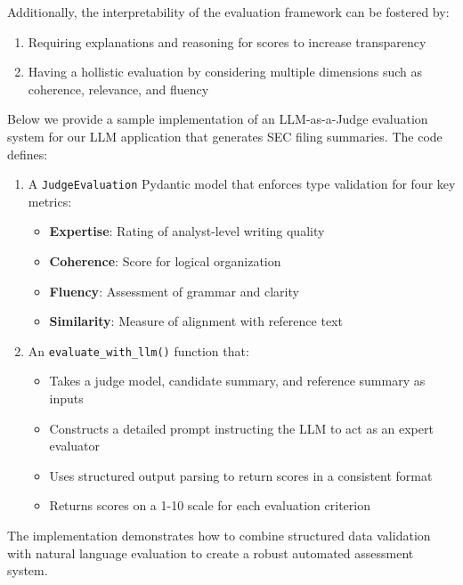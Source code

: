 Additionally, the interpretability of the evaluation framework can be fostered by:
\begin{enumerate}
    \item Requiring explanations and reasoning for scores to increase transparency 
    \item Having a hollistic evaluation by considering multiple dimensions such as coherence, relevance, and fluency
\end{enumerate}
Below we provide a sample implementation of an LLM-as-a-Judge evaluation system for our LLM application that generates SEC filing summaries. The code defines:

\begin{enumerate}
    \item A \texttt{JudgeEvaluation} Pydantic model that enforces type validation for four key metrics:
    \begin{itemize}
        \item \textbf{Expertise}: Rating of analyst-level writing quality
        \item \textbf{Coherence}: Score for logical organization  
        \item \textbf{Fluency}: Assessment of grammar and clarity
        \item \textbf{Similarity}: Measure of alignment with reference text
    \end{itemize}

    \item An \texttt{evaluate\_with\_llm()} function that:
    \begin{itemize}
        \item Takes a judge model, candidate summary, and reference summary as inputs
        \item Constructs a detailed prompt instructing the LLM to act as an expert evaluator
        \item Uses structured output parsing to return scores in a consistent format
        \item Returns scores on a 1-10 scale for each evaluation criterion
    \end{itemize}
\end{enumerate}

The implementation demonstrates how to combine structured data validation with natural language evaluation to create a robust automated assessment system.

